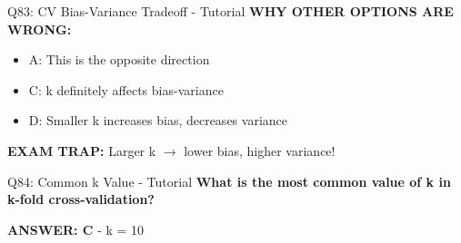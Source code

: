 \documentclass[8pt]{beamer}
\begin{document}
\begin{frame}{Q83: CV Bias-Variance Tradeoff - Tutorial}
		\vspace{0.05cm}
		\textcolor{myred}{\textbf{WHY OTHER OPTIONS ARE WRONG:}}
		\begin{itemize}
			\item \textcolor{myred}{A:} This is the opposite direction
			\item \textcolor{myred}{C:} k definitely affects bias-variance
			\item \textcolor{myred}{D:} Smaller k increases bias, decreases variance
		\end{itemize}
		
		\textcolor{myred}{\textbf{EXAM TRAP:}} Larger k $\to$ lower bias, higher variance!
	\end{frame}
	
	\begin{frame}{Q84: Common k Value - Tutorial}
		\fontsize{6.5}{7.5}\selectfont
		\textbf{What is the most common value of k in k-fold cross-validation?}
		
		\vspace{0.05cm}
		\textcolor{myblue}{\textbf{ANSWER: C}} - k = 10
		

\end{frame}
\end{document}
